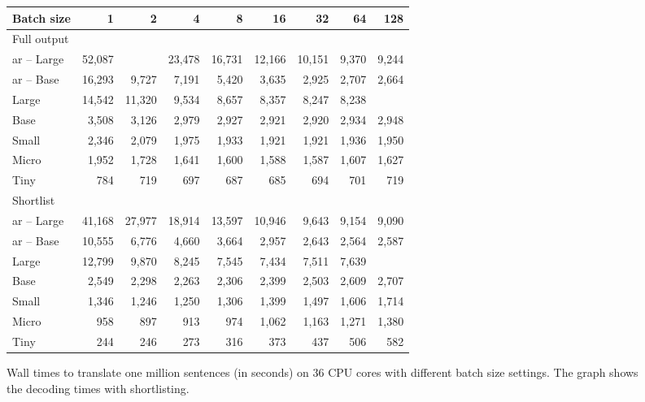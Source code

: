 \begin{figure}
  \centering

  
  \vspace{1\baselineskip}

  \begin{tabular}{lrrrrrrrr}
    \toprule
    Batch size & 1 & 2 & 4 & 8 & 16 & 32 & 64 & 128 \\


    \midrule
    Full output \\
    \acs{ar} -- Large & 52,087 &       & 23,478 & 16,731 & 12,166 & 10,151 & 9,370 & 9,244 \\
    \acs{ar} -- Base  & 16,293 & 9,727 &  7,191 &  5,420 &  3,635 &  2,925 & 2,707 & 2,664 \\
    \addlinespace
    Large & 14,542 & 11,320 & 9,534 & 8,657 & 8,357 & 8,247 & 8,238 & \\
    Base  &  3,508 &  3,126 & 2,979 & 2,927 & 2,921 & 2,920 & 2,934 & 2,948 \\
    Small &  2,346 &  2,079 & 1,975 & 1,933 & 1,921 & 1,921 & 1,936 & 1,950 \\
    Micro &  1,952 &  1,728 & 1,641 & 1,600 & 1,588 & 1,587 & 1,607 & 1,627 \\
    Tiny  &    784 &    719 &   697 &   687 &   685 &   694 &   701 &   719 \\


    \midrule
    Shortlist \\
    \acs{ar} -- Large & 41,168 & 27,977 & 18,914 & 13,597 & 10,946 & 9,643 & 9,154 & 9,090 \\
    \acs{ar} -- Base  & 10,555 &  6,776 &  4,660 &  3,664 &  2,957 & 2,643 & 2,564 & 2,587 \\
    \addlinespace
    Large & 12,799 & 9,870 & 8,245 & 7,545 & 7,434 & 7,511 & 7,639 & \\
    Base  &  2,549 & 2,298 & 2,263 & 2,306 & 2,399 & 2,503 & 2,609 & 2,707 \\
    Small &  1,346 & 1,246 & 1,250 & 1,306 & 1,399 & 1,497 & 1,606 & 1,714 \\
    Micro &    958 &   897 &   913 &   974 & 1,062 & 1,163 & 1,271 & 1,380 \\
    Tiny  &    244 &   246 &   273 &   316 &   373 &   437 &   506 &   582 \\


    \bottomrule
  \end{tabular}

  \caption{Wall times to translate one million sentences (in seconds) on 36 CPU
    cores with different batch size settings. The graph shows the decoding
    times with shortlisting.}%
  \label{fig:throughput:cpu36}
\end{figure}


